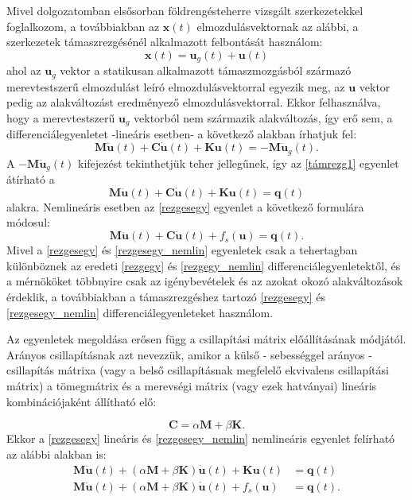 Mivel dolgozatomban elsősorban földrengésteherre vizsgált szerkezetekkel foglalkozom, a továbbiakban az $\mathbf{x}(t)$ elmozdulásvektornak az alábbi, a szerkezetek támaszrezgésénél alkalmazott felbontását használom:
\begin{equation}
\mathbf{x}(t) = \mathbf{u}_g(t)+\mathbf{u}(t)
\end{equation}
ahol az $\mathbf{u}_g$ vektor a statikusan alkalmazott támaszmozgásból származó merevtestszerű elmozdulást leíró elmozdulásvektorral egyezik meg, az $\mathbf{u}$ vektor pedig az alakváltozást eredményező elmozdulásvektorral.
Ekkor felhasználva, hogy a merevtestszerű $\mathbf{u}_g$ vektorból nem származik alakváltozás, így erő sem, a differenciálegyenletet -lineáris esetben- a következő alakban írhatjuk fel:
\begin{equation}
\label{támrezg1}
\mathbf{M}\mathbf{\ddot{u}}(t)+\mathbf{C}\mathbf{\dot{u}}(t)+\mathbf{K}\mathbf{u}(t) = -\mathbf{M}\mathbf{\ddot{u}}_g(t).
\end{equation}
A $-\mathbf{M}\mathbf{\ddot{u}}_g(t)$ kifejezést tekinthetjük teher jellegűnek, így az \eqref{támrezg1} egyenlet átírható a
\begin{equation}
\label{rezgesegy}
\mathbf{M}\mathbf{\ddot{u}}(t)+\mathbf{C}\mathbf{\dot{u}}(t)+\mathbf{K}\mathbf{u}(t) = \mathbf{q}(t)
\end{equation}
alakra. Nemlineáris esetben az \eqref{rezgesegy} egyenlet a következő formulára módosul:
\begin{equation}
\label{rezgesegy_nemlin}
 \mathbf{M}\mathbf{\ddot{u}}(t)+\mathbf{C}\mathbf{\dot{u}}(t)+f_s(\mathbf{u}) = \mathbf{q}(t).
 \end{equation}
Mivel a \eqref{rezgesegy} és \eqref{rezgesegy_nemlin} egyenletek csak a  tehertagban különböznek az eredeti \eqref{rezgegy} és \eqref{rezgegy_nemlin} differenciálegyenletektől, és a mérnököket többnyire csak az igénybevételek és az azokat okozó alakváltozások érdeklik, a továbbiakban a támaszrezgéshez tartozó \eqref{rezgesegy} és \eqref{rezgesegy_nemlin} differenciálegyenleteket használom. 

Az egyenletek megoldása erősen függ a csillapítási mátrix előállításának módjától.
Arányos csillapításnak azt nevezzük, amikor a külső - sebességgel arányos - csillapítás 
mátrixa (vagy a belső csillapításnak megfelelő ekvivalens csillapítási mátrix) a tömegmátrix 
és a merevségi mátrix (vagy ezek hatványai) lineáris kombinációjaként állítható elő:

\begin{equation}
\mathbf{C} = \alpha\mathbf{M}+\beta\mathbf{K}.
\end{equation}
Ekkor a \eqref{rezgesegy} lineáris és \eqref{rezgesegy_nemlin}  nemlineáris egyenlet felírható az alábbi alakban is:
\begin{align}
\mathbf{M}\mathbf{\ddot{u}}(t)+(\alpha\mathbf{M}+\beta\mathbf{K})\mathbf{\dot{u}}(t)+\mathbf{K}\mathbf{u}(t) & = \mathbf{q}(t) \\
\mathbf{M}\mathbf{\ddot{u}}(t)+(\alpha\mathbf{M}+\beta\mathbf{K})\mathbf{\dot{u}}(t)+f_s(\mathbf{u}) & = \mathbf{q}(t).
\end{align}

